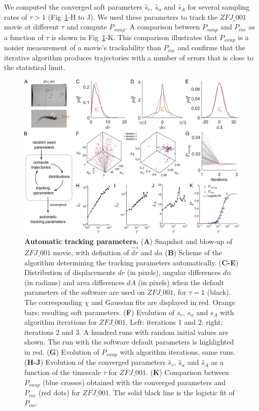         We computed the converged soft parameters $\hat{s}_r$, $\hat{s}_\alpha$ and $\hat{s}_A$ for several sampling rates of $\tau>1$ (Fig~\ref{part_1:fig_5}-H to J). We used these parameters to track the $ZFJ\_001$ movie at different $\tau$ and compute $P_{swap}$. A comparison between $P_{swap}$ and $P_{inc}$ as a function of $\tau$ is shown in Fig~\ref{part_1:fig_5}-K. This comparison illustrates that $P_{swap}$ is a noisier measurement of a movie's trackability than $P_{inc}$ and confirms that the iterative algorithm produces trajectories with a number of errors that is close to the statistical limit.

        \begin{figure}[h!]
        \centering
        \includegraphics[width=1\textwidth]{part_1/assets/Figure_5.png}
        \caption{{\bf Automatic tracking parameters.}
            (\textbf{A}) Snapshot and blow-up of $ZFJ\_001$ movie, with definition of $\vec{dr}$ and $d\alpha$
            (\textbf{B}) Scheme of the algorithm determining the tracking parameters automatically.
            (\textbf{C-E}) Distribution of displacements $dr$ (in pixels), angular differences $d\alpha$ (in radians) and area differences $dA$ (in pixels) when the default parameters of the software are used on $ZFJ\_001$, for $\tau=1$ (black). The corresponding $\chi$ and Gaussian fits are displayed in red. Orange bars: resulting soft parameters.
            (\textbf{F}) Evolution of $s_r$, $s_\alpha$ and $s_A$ with algorithm iterations for $ZFJ\_001$. Left: iterations 1 and 2; right: iterations 2 and 3. A hundred runs with random initial values are shown. The run with the software default parameters is highlighted in red.
            (\textbf{G}) Evolution of $P_{swap}$ with algorithm iterations, same runs.
            (\textbf{H-J}) Evolution of the converged parameters $\hat{s}_r$, $\hat{s}_\alpha$ and $\hat{s}_A$ as a function of the timescale $\tau$ for $ZFJ\_001$.
            (\textbf{K}) Comparison between $P_{swap}$ (blue crosses) obtained with the converged parameters and $P_{inc}$ (red dots) for $ZFJ\_001$. The solid black line is the logistic fit of $P_{inc}$.}
        \label{part_1:fig_5}
        \end{figure}


